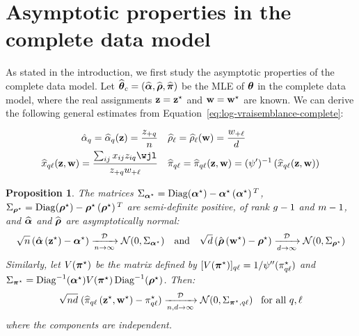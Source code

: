 \documentclass[bj]{imsart}
\numberwithin{equation}{section}
\theoremstyle{plain}
\newtheorem{proposition}[thm]{Proposition}
\theoremstyle{remark}
\begin{document}
\section{Asymptotic properties in the complete data model}
\label{sec:mle-complete-likelihood}
As stated in the introduction, we first study the asymptotic properties of the complete data model.
Let $\widehat{\boldsymbol{\theta}}_{c}=\left(\widehat{\boldsymbol{\alpha}},\widehat{\boldsymbol{\rho}},\widehat{\boldsymbol{\pi}}\right)$ be the MLE of $\boldsymbol{\theta}$ in the complete data model, where the real assignments $\mathbf{z}=\mathbf{z}^\star$ and $\mathbf{w}=\mathbf{w}^\star$ are known. We can derive the following general estimates from Equation~\eqref{eq:log-vraisemblance-complete}:

\begin{equation}
  \label{eq:mle-complete-likelihood}
  \begin{aligned}
    \hpi_{\kk}  = \pizk = \frac{\zsumk}{\n} & \quad
    \hrho_{\el}  = \rhowl = \frac{\wsuml}{\dd} \\
    \hxklzw = \frac{\sum_{\ii\jj} \xij \zik \wjl}{\zsumk \wsuml} & \quad
    \hal_{\kk\el}  = \alzwkl = \normpm \left(  \hxklzw \right)
  \end{aligned}
\end{equation}

\begin{proposition}
  \label{prop:mle-asymptotic-normality}
  The matrices $\Sigma_{\boldsymbol{\alpha}^\star} = \operatorname{Diag}(\boldsymbol{\alpha}^\star) - \boldsymbol{\alpha}^\star\left(\boldsymbol{\alpha}^\star\right){^{T}} $, $\Sigma_{\boldsymbol{\rho}^\star} = \operatorname{Diag}(\boldsymbol{\rho}^\star) - \boldsymbol{\rho}^\star\left(\boldsymbol{\rho}^\star\right){^{T}} $ are semi-definite positive, of rank $g-1$ and $m-1$, and $\widehat{\boldsymbol{\alpha}}$ and $\widehat{\boldsymbol{\rho}}$ are asymptotically normal:
  \begin{equation}
    \label{eq:mle-proportion-asymptotic-normality}
    \sqrt{\n}\left( \hat{\bpi}\left(\bzs\right) - \bpis \right) \xrightarrow[\n \to \infty]{\mathcal{D}} \mathcal{N}(0, \Sigma_{\bpis})
    \quad \text{and} \quad
    \sqrt{\dd}\left( \hat{\brho}\left(\bws\right) - \brhos \right) \xrightarrow[\dd \to \infty]{\mathcal{D}} \mathcal{N}(0, \Sigma_{\brhos})
  \end{equation}
Similarly, let $V(\boldsymbol{\pi}^\star)$ be the matrix defined by $[V(\boldsymbol{\pi}^\star)]_{q\ell} = 1/\psi''(\pi^\star_{q\ell})$ and\\  $\Sigma_{\boldsymbol{\pi}^\star} = \operatorname{Diag}^{-1}(\boldsymbol{\alpha}^\star) V(\boldsymbol{\pi}^\star) \operatorname{Diag}^{-1}(\boldsymbol{\rho}^\star)$. Then:
  \begin{equation}
    \label{eq:mle-parameters-asymptotic-normality}
    \sqrt{\n\dd}\;(\hal_{\kk\el}\left(\bzs,\bws\right) - \al^\vrai_{\kk\el}) \xrightarrow[\n, \dd \to \infty]{\mathcal{D}}  \mathcal{N}(0, \Sigma_{\bals, \kk\el})\;\;\; \hbox{for all  } \kk, \el
  \end{equation}
  where the components are independent. 
\end{proposition}
\end{document}
